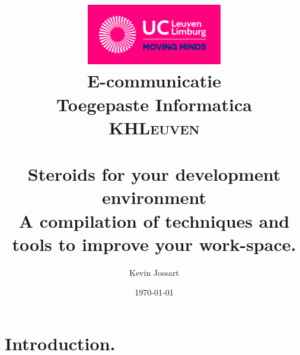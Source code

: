 \documentclass[paper=a4, fontsize=10pt]{scrartcl} %
\title{	
\includegraphics[width=2.3272in,height=1.0417in]{template-img1.png}\\
\normalfont \normalsize 
E-communicatie\\
Toegepaste Informatica \\
\textsc{KHLeuven} \\ [25pt] %
\horrule{0.5pt} \\[0.4cm] %
\huge Steroids for your development environment\\ %
\small A compilation of techniques and tools to improve your work-space. %
\horrule{2pt} \\[0.5cm] %
}
\author{Kevin Jossart} %
\date{\normalsize\today} %
\numberwithin{equation}{section} %
\numberwithin{figure}{section} %
\numberwithin{table}{section} %
\begin{document}
\begin{titlepage}
\maketitle %
\end{titlepage}


\tableofcontents %
\newpage %


\section{Introduction.}
\end{document}
